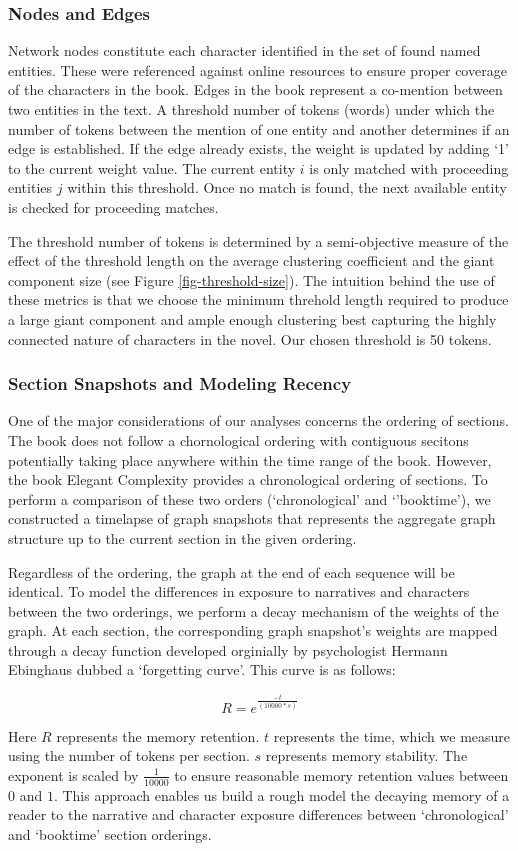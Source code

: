 \subsubsection{Nodes and Edges}
Network nodes constitute each character identified in the set of found named entities. These were referenced against online resources to ensure proper coverage of the characters in the book. Edges in the book represent a co-mention between two entities in the text. A threshold number of tokens (words) under which the number of tokens between the mention of one entity and another determines if an edge is established. If the edge already exists, the weight is updated by adding `1' to the current weight value. The current entity $i$ is only matched with proceeding entities $j$ within this threshold. Once no match is found, the next available entity is checked for proceeding matches.

The threshold number of tokens is determined by a semi-objective measure of the effect of the threshold length on the average clustering coefficient and the giant component size (see Figure \ref{fig-threshold-size}). The intuition behind the use of these metrics is that we choose the minimum threhold length required to produce a large giant component and ample enough clustering best capturing the highly connected nature of characters in the novel. Our chosen threshold is 50 tokens.

\subsubsection{Section Snapshots and Modeling Recency}
One of the major considerations of our analyses concerns the ordering of sections. The book does not follow a chornological ordering with contiguous secitons potentially taking place anywhere within the time range of the book. However, the book Elegant Complexity \cite{carlisle_2007} provides a chronological ordering of sections. To perform a comparison of these two orders (`chronological' and `'booktime'), we constructed a timelapse of graph snapshots that represents the aggregate graph structure up to the current section in the given ordering. 

Regardless of the ordering, the graph at the end of each sequence will be identical. To model the differences in exposure to narratives and characters between the two orderings, we perform a decay mechanism of the weights of the graph. At each section, the corresponding graph snapshot's weights are mapped through a decay function developed orginially by psychologist Hermann Ebinghaus dubbed a `forgetting curve'. This curve is as follows:


\begin{equation}
    R = e^{\frac{-t}{(10000*s)}}
\end{equation}


Here $R$ represents the memory retention. $t$ represents the time, which we measure using the number of tokens per section. $s$ represents memory stability. The exponent is scaled by $\frac{1}{10000}$ to ensure reasonable memory retention values between $0$ and $1$. This approach enables us build a rough model the decaying memory of a reader to the narrative and character exposure differences between `chronological' and `booktime' section orderings.